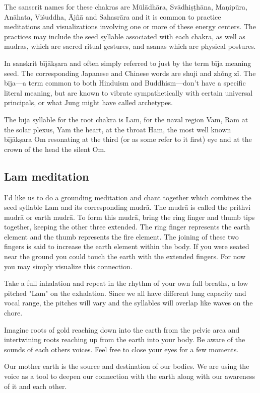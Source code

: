 \documentclass[12pt]{article}
\begin{document}
The sanscrit names for these chakras are Mūlādhāra, Svādhiṣṭhāna, Maṇipūra, Anāhata, Viśuddha, Ājñā and Sahasrāra and it is common to practice meditations and visualizations involving one or more of these energy centers. The practices may include the seed syllable associated with each chakra, as well as mudras, which are sacred ritual gestures, and asanas which are physical postures.

In sanskrit bījākṣara and often simply referred to just by the term bīja meaning seed. The corresponding Japanese and Chinese words are shuji and zhǒng zǐ. The bīja—a term common to both Hinduism and Buddhism—don't have a specific literal meaning, but are known to vibrate sympathetically with certain universal principals, or what Jung might have called archetypes.

The bīja syllable for the root chakra is Lam, for the naval region Vam, Ram at the solar plexus, Yam the heart, at the throat Ham, the most well known bījākṣara Om resonating at the third (or as some refer to it first) eye and at the crown of the head the silent Om.

\subsection*{Lam meditation}

I'd like us to do a grounding meditation and chant together which combines the seed syllable Lam and its corresponding mudrā. The mudrā is called the prithvi mudrā or earth mudrā. To form this mudrā, bring the ring finger and thumb tips together, keeping the other three extended. The ring finger represents the earth element and the thumb represents the fire element. The joining of these two fingers is said to increase the earth element within the body. If you were seated near the ground you could touch the earth with the extended fingers. For now you may simply visualize this connection.

Take a full inhalation and repeat in the rhythm of your own full breaths, a low pitched "Lam" on the exhalation. Since we all have different lung capacity and vocal range, the pitches will vary and the syllables will overlap like waves on the chore.

Imagine roots of gold reaching down into the earth from the pelvic area and intertwining roots reaching up from the earth into your body. Be aware of the sounds of each others voices. Feel free to close your eyes for a few moments.

Our mother earth is the source and destination of our bodies. We are using the voice as a tool to deepen our connection with the earth along with our awareness of it and each other.
\end{document}
